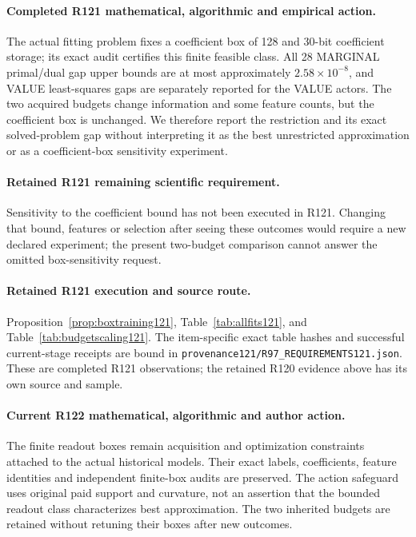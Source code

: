 \paragraph{Completed R121 mathematical, algorithmic and empirical action.}
The actual fitting problem fixes a coefficient box of 128 and 30-bit coefficient storage; its exact audit certifies this finite feasible class. All 28 MARGINAL primal/dual gap upper bounds are at most approximately $2.58\times10^{-8}$, and VALUE least-squares gaps are separately reported for the VALUE actors. The two acquired budgets change information and some feature counts, but the coefficient box is unchanged. We therefore report the restriction and its exact solved-problem gap without interpreting it as the best unrestricted approximation or as a coefficient-box sensitivity experiment.

\paragraph{Retained R121 remaining scientific requirement.}
Sensitivity to the coefficient bound has not been executed in R121. Changing that bound, features or selection after seeing these outcomes would require a new declared experiment; the present two-budget comparison cannot answer the omitted box-sensitivity request.

\paragraph{Retained R121 execution and source route.}
Proposition~\ref{prop:boxtraining121}, Table~\ref{tab:allfits121}, and Table~\ref{tab:budgetscaling121}.
The item-specific exact table hashes and successful current-stage receipts are bound in \nolinkurl{provenance121/R97_REQUIREMENTS121.json}. These are completed R121 observations; the retained R120 evidence above has its own source and sample.
\paragraph{Current R122 mathematical, algorithmic and author action.}
The finite readout boxes remain acquisition and optimization constraints attached to the actual historical models. Their exact labels, coefficients, feature identities and independent finite-box audits are preserved. The action safeguard uses original paid support and curvature, not an assertion that the bounded readout class characterizes best approximation. The two inherited budgets are retained without retuning their boxes after new outcomes.
